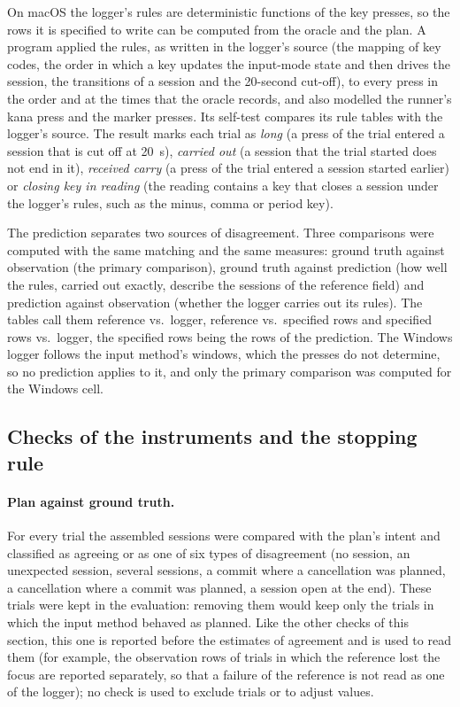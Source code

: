 On macOS the logger's rules are deterministic functions of the key presses, so the rows it is specified to write can
be computed from the oracle and the plan. A program applied the rules, as written in the logger's source (the mapping
of key codes, the order in which a key updates the input-mode state and then drives the session, the transitions of a
session and the 20-second cut-off), to every press in the order and at the times that the oracle records, and also
modelled the runner's kana press and the marker presses. Its self-test compares its rule tables with the logger's
source. The result marks each trial as \emph{long} (a press of the trial entered a session that is cut off at 20~s),
\emph{carried out} (a session that the trial started does not end in it), \emph{received carry} (a press of the trial
entered a session started earlier) or \emph{closing key in reading} (the reading contains a key that closes a session
under the logger's rules, such as the minus, comma or period key).

The prediction separates two sources of disagreement. Three comparisons were computed with the same matching and the
same measures: ground truth against observation (the primary comparison), ground truth against prediction (how well
the rules, carried out exactly, describe the sessions of the reference field) and prediction against observation
(whether the logger carries out its rules). The tables call them reference vs.\ logger, reference vs.\ specified rows
and specified rows vs.\ logger, the specified rows being the rows of the prediction. The Windows logger follows the
input method's windows, which the presses do not determine, so no prediction applies to it, and only the primary
comparison was computed for the Windows cell.

\subsection{Checks of the instruments and the stopping rule}
\label{sec:method-checks}

\paragraph{Plan against ground truth.} For every trial the assembled sessions were compared with the plan's intent and
classified as agreeing or as one of six types of disagreement (no session, an unexpected session, several sessions, a
commit where a cancellation was planned, a cancellation where a commit was planned, a session open at the end). These
trials were kept in the evaluation: removing them would keep only the trials in which the input method behaved as
planned. Like the other checks of this section, this one is reported before the estimates of agreement and is used to
read them (for example, the observation rows of trials in which the reference lost the focus are reported separately,
so that a failure of the reference is not read as one of the logger); no check is used to exclude trials or to adjust
values.

